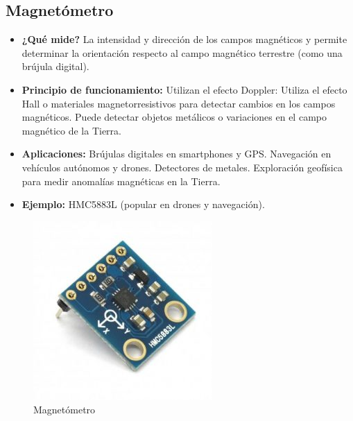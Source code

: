 \subsection*{Magnetómetro}
\begin{itemize}
	\item \textbf{¿Qué mide?} La intensidad y dirección de los campos magnéticos y permite determinar la orientación respecto al campo magnético terrestre (como una brújula digital).
	\item \textbf{Principio de funcionamiento:} Utilizan el efecto Doppler: Utiliza el efecto Hall o materiales magnetorresistivos para detectar cambios en los campos magnéticos.
	Puede detectar objetos metálicos o variaciones en el campo magnético de la Tierra.
	\item \textbf{Aplicaciones:} Brújulas digitales en smartphones y GPS.
	Navegación en vehículos autónomos y drones.
	Detectores de metales.
	Exploración geofísica para medir anomalías magnéticas en la Tierra.
	\item \textbf{Ejemplo:} HMC5883L (popular en drones y navegación).
\end{itemize}
\begin{figure}[h]
	\centering
	\includegraphics[width=0.3\linewidth]{img/magnetometro}
	\caption{Magnetómetro}
	\label{fig:magnetometro}
\end{figure}

